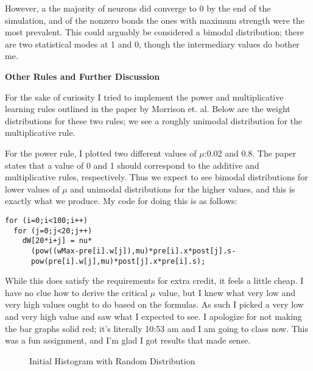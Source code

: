 \documentclass[a4paper,12pt]{article}
\begin{document}
\vspace{2mm}

However, a the majority of neurons did converge to 0 by the end of the simulation, and of the nonzero bonds the ones with maximum strength were the most prevalent. This could arguably be considered a bimodal distribution; there are two statistical modes at 1 and 0, though the intermediary values do bother me.  

{\bf Other Rules and Further Discussion}

For the sake of curiosity I tried to implement the power  and multiplicative learning rules outlined in the paper by Morrison et. al. Below are the weight distributions for these two rules; we see a roughly unimodal distribution for the multiplicative rule.

\vspace{2mm}

For the power rule, I plotted two different values of $\mu$:0.02 and 0.8. The paper states that a value of 0 and 1 should correspond to the additive and multiplicative rules, respectively. Thus we expect to see bimodal distributions for lower values of $\mu$ and unimodal distributions for the higher values, and this is exactly what we produce. My code for doing this is as follows:

\begin{verbatim}
for (i=0;i<100;i++)
  for (j=0;j<20;j++)
    dW[20*i+j] = nu*
      (pow((wMax-pre[i].w[j]),mu)*pre[i].x*post[j].s-
      pow(pre[i].w[j],mu)*post[j].x*pre[i].s);
\end{verbatim}

While this does satisfy the requirements for extra credit, it feels a little cheap. I have no clue how to derive the critical $\mu$ value, but I knew what very low and very high values ought to do based on the formulas. As such I picked a very low and very high value and saw what I expected to see. I apologize for not making the bar graphs solid red; it's literally 10:53 am and I am going to class now. This was a fun assignment, and I'm glad I got results that made sense. 

\vfil\eject

\begin{center}
  \begin{figure}[h!]
    \caption{\label{pict1}Initial Histogram with Random Distribution}
  \end{figure}
\end{center}
\end{document}

